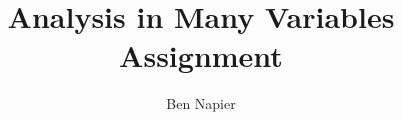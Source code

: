\documentclass[a4paper, answers]{exam}
\title{Analysis in Many Variables Assignment}
\author{Ben Napier}
\begin{document}
    \maketitle
    \begin{questions}
        
        
        
        
        
        
        
        
        
    \end{questions}
\end{document}

